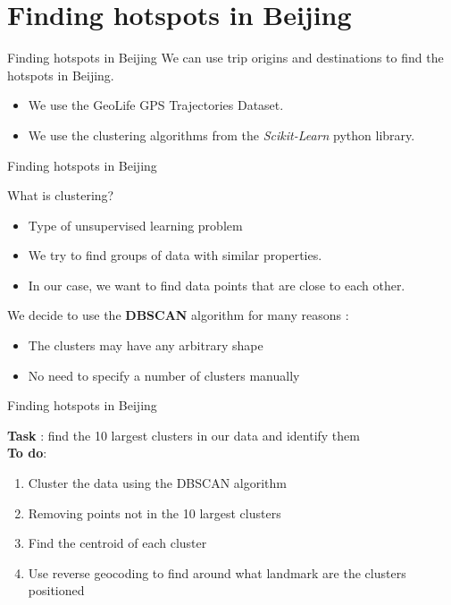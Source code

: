 \documentclass[aspectratio=169]{beamer}
\begin{document}
\section{Finding hotspots in Beijing}

\begin{frame}{Finding hotspots in Beijing}
We can use trip origins and destinations to find the hotspots in Beijing.

\begin{itemize}
	\item We use the GeoLife GPS Trajectories Dataset.
	\item We use the clustering algorithms from the \textit{Scikit-Learn} python library\cite{pedregosa2011scikit}.
\end{itemize}
\end{frame}

\begin{frame}{Finding hotspots in Beijing}

{\Large What is clustering?}
\vspace{.5cm}

\begin{itemize}
	\item Type of unsupervised learning problem
	\item We try to find groups of data with similar properties.
	\item In our case, we want to find data points that are close to each other.
\end{itemize}
\vspace{.5cm}

We decide to use the \textbf{DBSCAN}\cite{ester1996density} algorithm for many reasons :
\begin{itemize}
	\item The clusters may have any arbitrary shape
	\item No need to specify a number of clusters manually
\end{itemize}
\end{frame}

\begin{frame}{Finding hotspots in Beijing}

{\Large \textbf{Task} : find the 10 largest clusters in our data and identify them}
\vspace{.5cm}
\\
{\Large \textbf{To do}}:
\begin{enumerate}
	\item Cluster the data using the DBSCAN algorithm
	\item Removing points not in the 10 largest clusters
	\item Find the centroid of each cluster
	\item Use reverse geocoding to find around what landmark are the clusters positioned
\end{enumerate}
\end{frame}
\end{document}
